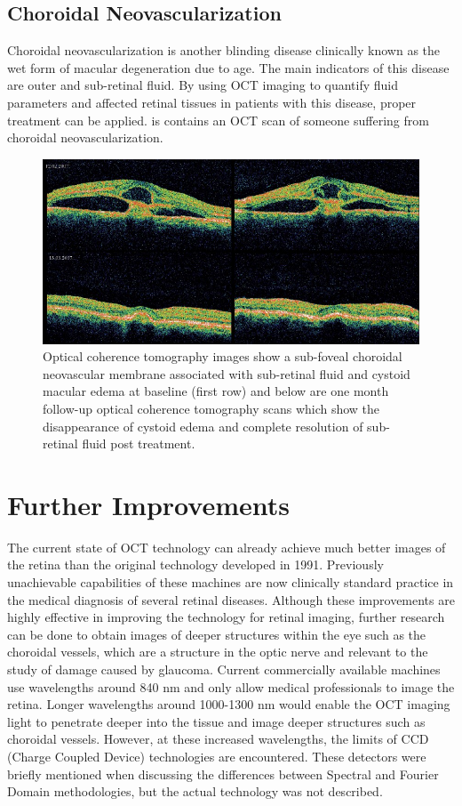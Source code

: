 \subsection{Choroidal Neovascularization}
Choroidal neovascularization is another blinding disease clinically known as the wet form of macular degeneration due to age.  The main indicators of this disease are outer and sub-retinal fluid. \cite{mbib_4}  By using OCT imaging to quantify fluid parameters and affected retinal tissues in patients with this disease, proper treatment can be applied.\cite{mbib_4}  is contains an OCT scan of someone suffering from choroidal neovascularization.

\begin{figure}[htbp]
\centering
\includegraphics{figures/morgan_8}
\caption{ Optical coherence tomography images show a sub-foveal choroidal neovascular membrane associated with sub-retinal fluid and cystoid macular edema at baseline (first row) and below are one month follow-up optical coherence tomography scans which show the disappearance of cystoid edema and complete resolution of sub-retinal fluid post treatment. \cite{mbib_11} }
\label{fig:m_8}
\end{figure}

\section{Further Improvements}
The current state of OCT technology can already achieve much better images
 of the retina than the original technology developed in 1991.  Previously 
unachievable capabilities of these machines are now clinically standard practice 
in the medical diagnosis of several retinal diseases.  Although these
 improvements are highly effective in improving the technology for retinal 
imaging, further research can be done to obtain images of deeper structures 
within the eye such as the choroidal vessels, which are a structure in the optic 
nerve and relevant to the study of damage caused by glaucoma. \cite{mbib_4} 
Current commercially available machines use wavelengths around 840 nm
and only allow medical professionals to image the retina.  Longer wavelengths 
around 1000-1300 nm would enable the OCT imaging light to penetrate deeper 
into the tissue and image deeper structures such as choroidal vessels. 
\cite{mbib_4}  However, at these increased wavelengths, the limits of CCD 
(Charge Coupled Device) technologies are encountered.  These detectors 
were briefly mentioned when discussing the differences between Spectral 
and Fourier Domain methodologies, but the actual technology was not 
described. 
 
